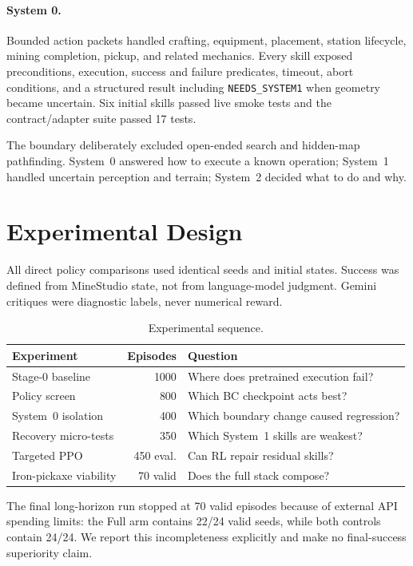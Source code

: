 \documentclass[10pt,twocolumn]{article}
\begin{document}
\paragraph{System 0.}
Bounded action packets handled crafting, equipment, placement, station lifecycle, mining completion, pickup, and related mechanics. Every skill exposed preconditions, execution, success and failure predicates, timeout, abort conditions, and a structured result including \texttt{NEEDS\_SYSTEM1} when geometry became uncertain. Six initial skills passed live smoke tests and the contract/adapter suite passed 17 tests.

The boundary deliberately excluded open-ended search and hidden-map pathfinding. System~0 answered how to execute a known operation; System~1 handled uncertain perception and terrain; System~2 decided what to do and why.

\section{Experimental Design}
All direct policy comparisons used identical seeds and initial states. Success was defined from MineStudio state, not from language-model judgment. Gemini critiques were diagnostic labels, never numerical reward.

\begin{table}[t]
\centering
\caption{Experimental sequence.}
\label{tab:experiments}
\scriptsize
\begin{tabular}{@{}p{}rp{}@{}}
\hline
Experiment & Episodes & Question \\
\hline
Stage-0 baseline & 1000 & Where does pretrained execution fail? \\
Policy screen & 800 & Which BC checkpoint acts best? \\
System~0 isolation & 400 & Which boundary change caused regression? \\
Recovery micro-tests & 350 & Which System~1 skills are weakest? \\
Targeted PPO & 450 eval. & Can RL repair residual skills? \\
Iron-pickaxe viability & 70 valid & Does the full stack compose? \\
\hline
\end{tabular}
\end{table}

The final long-horizon run stopped at 70 valid episodes because of external API spending limits: the Full arm contains 22/24 valid seeds, while both controls contain 24/24. We report this incompleteness explicitly and make no final-success superiority claim.
\end{document}

